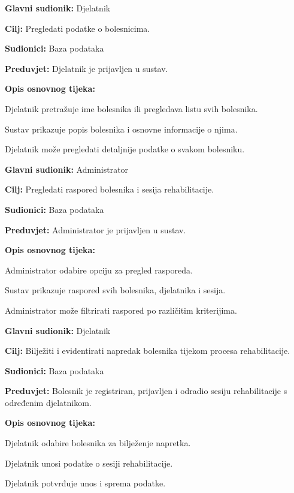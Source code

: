 \documentclass[12pt]{report}
\newenvironment{packed_enum}{
	\begin{enumerate}
		\setlength{\itemsep}{0pt}
		\setlength{\parskip}{0pt}
		\setlength{\parsep}{0pt}
	}{\end{enumerate}}
\begin{document}
	\item \textbf{Glavni sudionik:} Djelatnik
	\item \textbf{Cilj:} Pregledati podatke o bolesnicima.
	\item \textbf{Sudionici:} Baza podataka
	\item \textbf{Preduvjet:} Djelatnik je prijavljen u sustav.
	\item \textbf{Opis osnovnog tijeka:}
	\begin{packed_enum}
		\item Djelatnik pretražuje ime bolesnika ili pregledava listu svih bolesnika.
		\item Sustav prikazuje popis bolesnika i osnovne informacije o njima.
		\item Djelatnik može pregledati detaljnije podatke o svakom bolesniku.
	\end{packed_enum}
\closeusecase


	\item \textbf{Glavni sudionik:} Administrator
	\item \textbf{Cilj:} Pregledati raspored bolesnika i sesija rehabilitacije.
	\item \textbf{Sudionici:} Baza podataka
	\item \textbf{Preduvjet:} Administrator je prijavljen u sustav.
	\item \textbf{Opis osnovnog tijeka:}
	\begin{packed_enum}
		\item Administrator odabire opciju za pregled rasporeda.
		\item Sustav prikazuje raspored svih bolesnika, djelatnika i sesija.
		\item Administrator može filtrirati raspored po različitim kriterijima.
	\end{packed_enum}
\closeusecase


	\item \textbf{Glavni sudionik:} Djelatnik
	\item \textbf{Cilj:} Bilježiti i evidentirati napredak bolesnika tijekom procesa rehabilitacije.
	\item \textbf{Sudionici:} Baza podataka
	\item \textbf{Preduvjet:} Bolesnik je registriran, prijavljen i odradio sesiju rehabilitacije s određenim djelatnikom.
	\item \textbf{Opis osnovnog tijeka:}
	\begin{packed_enum}
		\item Djelatnik odabire bolesnika za bilježenje napretka.
		\item Djelatnik unosi podatke o sesiji rehabilitacije.
		\item Djelatnik potvrđuje unos i sprema podatke.
	\end{packed_enum}
\closeusecase
\end{document}
